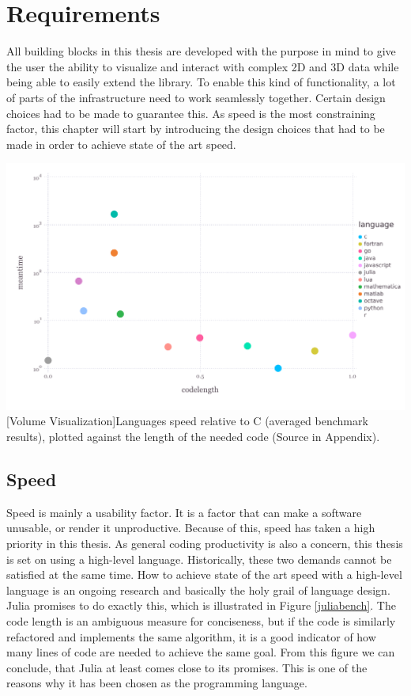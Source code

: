 \section{Requirements}

All building blocks in this thesis are developed with the purpose in mind to give the user the ability to visualize and interact with complex 2D and 3D data while being able to easily extend the library.
To enable this kind of functionality, a lot of parts of the infrastructure need to work seamlessly together.
Certain design choices had to be made to guarantee this. As speed is the most constraining factor, this chapter will start by introducing the design choices that had to be made in order to achieve state of the art speed.

\vspace{1em}
\begin{minipage}{\linewidth}
    \centering
    \includegraphics[width=0.9\linewidth]{graphics/julia_bench.pdf}
    [Volume Visualization]{Languages speed relative to C (averaged benchmark results), plotted against the length of the needed code (Source in Appendix).}
    \label{fig:juliabench}
\end{minipage}


\subsection{Speed}
Speed is mainly a usability factor. It is a factor that can make a software unusable, or render it unproductive. Because of this, speed has taken a high priority in this thesis. 
As general coding productivity is also a concern, this thesis is set on using a high-level language.
Historically, these two demands cannot be satisfied at the same time.
How to achieve state of the art speed with a high-level language is an ongoing research and basically the holy grail of language design. 
Julia promises to do exactly this, which is illustrated in Figure \cref{juliabench}. 
The code length is an ambiguous measure for conciseness, but if the code is similarly refactored and implements the same algorithm, it is a good indicator of how many lines of code are needed to achieve the same goal.
From this figure we can conclude, that Julia at least comes close to its promises. This is one of the reasons why it has been chosen as the programming language.

